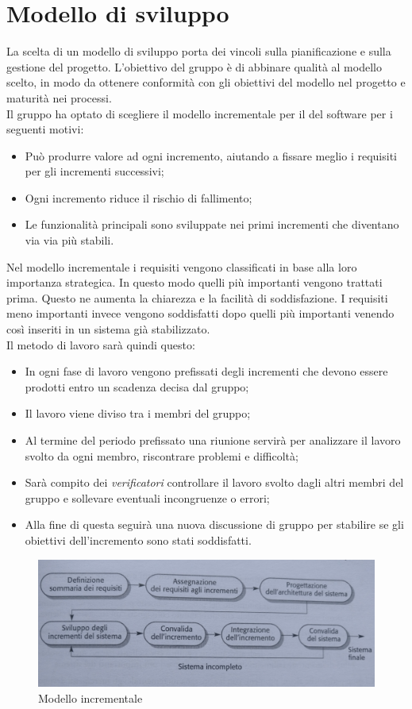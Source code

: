 \section{Modello di sviluppo}
La scelta di un modello di sviluppo porta dei vincoli sulla pianificazione e sulla gestione del progetto.
L'obiettivo del gruppo è di abbinare qualità al modello scelto, in modo da ottenere conformità con gli obiettivi del modello nel progetto
e maturità nei processi.\\ 
Il gruppo ha optato di scegliere il modello incrementale per il  del software per i seguenti motivi:
\begin{itemize}
    \item Può produrre valore ad ogni incremento, aiutando a fissare meglio i requisiti per gli incrementi successivi;
    \item Ogni incremento riduce il rischio di fallimento;
    \item Le funzionalità principali sono sviluppate nei primi incrementi che diventano via via più stabili.
\end{itemize}
Nel modello incrementale i requisiti vengono classificati in base alla loro importanza strategica. In questo modo
quelli più importanti vengono trattati prima. Questo ne aumenta la chiarezza e la facilità di soddisfazione. I requisiti
meno importanti invece vengono soddisfatti dopo quelli più importanti venendo così inseriti in un sistema già stabilizzato. \\
Il metodo di lavoro sarà quindi questo:
\begin{itemize}
    \item In ogni fase di lavoro vengono prefissati degli incrementi che devono essere prodotti entro un scadenza decisa dal gruppo;
    \item Il lavoro viene diviso tra i membri del gruppo;
    \item Al termine del periodo prefissato una riunione servirà per analizzare il lavoro svolto da ogni membro, riscontrare problemi e difficoltà;
    \item Sarà compito dei \textit{verificatori} controllare il lavoro svolto dagli altri membri del gruppo e sollevare eventuali incongruenze o errori;
    \item Alla fine di questa  seguirà una nuova discussione di gruppo per stabilire se gli obiettivi dell'incremento sono stati soddisfatti. 
\end{itemize}

\begin{figure}[H]
    \centering
    \includegraphics[scale=0.75]{immagini/incrementale.png}
    \caption{Modello incrementale}
\end{figure}